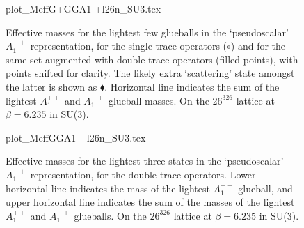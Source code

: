 \documentclass[12pt]{article}
\begin{document}



\clearpage


\begin{figure}[htb]
\begin	{center}
\leavevmode
	{plot_MeffG+GGA1-+l26n_SU3.tex}
\end	{center}
\caption{Effective masses for the lightest few glueballs in the `pseudoscalar' $A_1^{-+}$
  representation, for the single trace operators ($\circ$) and for the same set
  augmented with double trace operators (filled points), with points shifted for clarity.
  The likely extra `scattering' state amongst the latter is shown as $\blacklozenge$. 
  Horizontal line indicates the sum of the lightest $A_1^{++}$ and $A_1^{-+}$ glueball masses.
  On the $26^326$ lattice at $\beta=6.235$ in SU(3).}
\label{fig_MeffG+GGA1-+l26n_SU3}
\end{figure}

\begin{figure}[htb]
\begin	{center}
\leavevmode
	{plot_MeffGGA1-+l26n_SU3.tex}
\end	{center}
\caption{Effective masses for the lightest three states
  in the `pseudoscalar' $A_1^{-+}$ representation, for the double trace operators.
  Lower horizontal line indicates the mass of the lightest $A_1^{-+}$ glueball, and
  upper  horizontal line indicates the sum of the masses of the lightest
  $A_1^{++}$ and $A_1^{-+}$ glueballs.
  On the $26^326$ lattice at $\beta=6.235$ in SU(3).}
\label{fig_MeffGGA1-+l26n_SU3}
\end{figure}
\end{document}
